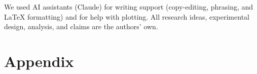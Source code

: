 \documentclass[11pt]{article}
\begin{document}
We used AI assistants (Claude) for writing support (copy-editing, phrasing, and LaTeX formatting) and for help with plotting. All research ideas, experimental design, analysis, and claims are the authors' own.


\clearpage
\appendix
\section*{Appendix}

\newcommand{\tokenbox}[2]{%
  \colorbox[rgb]{#1}{\strut\footnotesize\texttt{#2}}%
}
\setlength{\fboxsep}{1.0pt}

\newcommand{\routingcolorbar}{%
\begin{tikzpicture}
  \shade[left color={rgb,1:red,0.445;green,0.692;blue,0.827},
         middle color={rgb,1:red,1.0;green,1.0;blue,1.0},
         right color={rgb,1:red,0.992;green,0.859;blue,0.780}]
    (0,0) rectangle (6,0.25);
  \draw[black,line width=0.3pt] (0,0) rectangle (6,0.25);
  \node[anchor=east, font=\footnotesize] at (-0.1,0.125) {wide-leaning};
  \node[anchor=west, font=\footnotesize] at (6.1,0.125) {deep-leaning};
\end{tikzpicture}}
\end{document}
